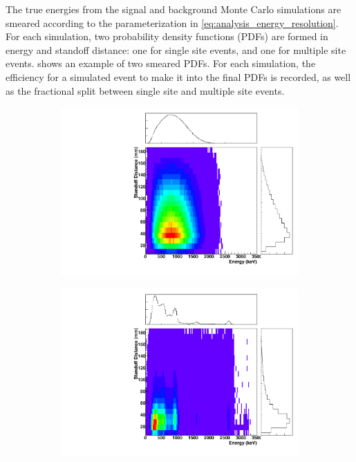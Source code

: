 \documentclass[herrin-thesis.tex]{subfiles}
\begin{document}
The true energies from the signal and background Monte Carlo simulations are smeared according to the parameterization in \cref{eq:analysis_energy_resolution}. For each simulation, two probability density functions (PDFs) are formed in energy and standoff distance: one for single site events, and one for multiple site events.  shows an example of two smeared PDFs. For each simulation, the efficiency for a simulated event to make it into the final PDFs is recorded, as well as the fractional split between single site and multiple site events.

\begin{figure}[htp]
\centering
	\begin{subfigure}[b]{0.48\textwidth}
	\centering
	\includegraphics[width=\textwidth]{./plots/PDFs/analysis_pdf_bb2n_ss.pdf}
	\end{subfigure}\hfill%
	\begin{subfigure}[b]{0.48\textwidth}
	\centering
	\includegraphics[width=\textwidth]{./plots/PDFs/analysis_pdf_AllVessel_Th232_ss.pdf}

\end{subfigure}
\end{figure}
\end{document}
